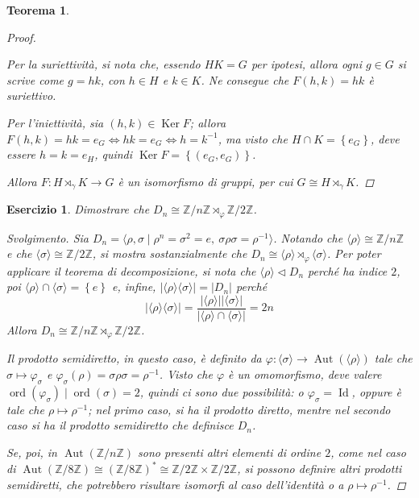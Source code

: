 \documentclass[12pt]{scrartcl}
\theoremstyle{style}
\newtheorem{teorema}{Teorema}[section]
\newtheorem{esercizio}{Esercizio}[section]
\newenvironment{svolgimento}{\renewcommand\qedsymbol{$\blacksquare$}\begin{proof}[Svolgimento]}{\end{proof}}
\numberwithin{equation}{subsection}
\begin{document}
\begin{teorema}
\begin{proof}
\begin{itemize}
				Per la suriettivit\`a, si nota che, essendo $HK = G$ per ipotesi, allora ogni $g \in G$ si scrive come $g = hk$, con $h \in H$ e $k \in K$.
				Ne consegue che $F(h,k) = hk$ \`e suriettivo.

				Per l'iniettivit\`a, sia $(h,k) \in \operatorname{Ker} F$; allora $F(h,k) = hk = e_G \iff hk = e_G \iff h = k^{-1}$, ma visto che $H\cap K = \left\{ e_G \right\} $, deve essere $h=k = e_H$, quindi $\operatorname{Ker} F = \left\{ (e_G,e_G) \right\} $.
		\end{itemize}
	Allora $F: H\rtimes _\gamma K \to G$ \`e un isomorfismo di gruppi, per cui $G \cong H \rtimes _\gamma K$.
	\end{proof}
\end{teorema}
\begin{esercizio}
Dimostrare che $D_n \cong \mathbb{Z}/ n\mathbb{Z}\rtimes _\varphi \mathbb{Z}/ 2\mathbb{Z}$.
\begin{svolgimento}
	Sia $D_n = \langle \rho , \sigma   \mid \rho ^n = \sigma ^2 = e, \ \sigma \rho \sigma = \rho ^{-1} \rangle$. 
	Notando che $\langle \rho  \rangle\cong \mathbb{Z} / n \mathbb{Z}$ e che $\langle \sigma  \rangle\cong \mathbb{Z} / 2 \mathbb{Z}$, si mostra sostanzialmente che $D_n\cong \langle \rho  \rangle\rtimes_\varphi  \langle \sigma  \rangle$.
	Per poter applicare il teorema di decomposizione, si nota che $\langle \rho  \rangle \lhd D_n$ perch\'e ha indice $2$, poi $\langle \rho  \rangle\cap \langle \sigma  \rangle = \left\{ e \right\} $ e, infine, $\lvert \langle \rho  \rangle\langle \sigma  \rangle \rvert = \lvert D_n \rvert $ perch\'e
\[
\lvert \langle \rho  \rangle\langle \sigma  \rangle \rvert = \frac{\lvert \langle \rho  \rangle \rvert \lvert \langle \sigma  \rangle \rvert }{\lvert \langle \rho  \rangle\cap\langle \sigma  \rangle \rvert } = 2n
\] 
Allora $D_n \cong \mathbb{Z}/n\mathbb{Z}\rtimes _\varphi \mathbb{Z}/2\mathbb{Z}$.

	Il prodotto semidiretto, in questo caso, \`e definito da $\varphi : \langle \sigma  \rangle\to \operatorname{Aut} (\langle \rho  \rangle)$ tale che $\sigma \longmapsto \varphi _\sigma  $ e $\varphi _\sigma (\rho ) = \sigma \rho \sigma = \rho ^{-1}$.
	Visto che $\varphi$ \`e un omomorfismo, deve valere $\operatorname{ord}(\varphi _\sigma )  \mid \operatorname{ord}(\sigma  ) =2$, quindi ci sono due possibilit\`a: o $\varphi _\sigma  = \operatorname{Id} $, oppure \`e tale che $\rho \longmapsto \rho ^{-1}$; nel primo caso, si ha il prodotto diretto, mentre nel secondo caso si ha il prodotto semidiretto che definisce $D_n$.

	Se, poi, in $\operatorname{Aut} (\mathbb{Z}/n\mathbb{Z})$ sono presenti altri elementi di ordine $2$, come nel caso di $\operatorname{Aut} (\mathbb{Z}/8\mathbb{Z})\cong (\mathbb{Z}/8\mathbb{Z})^* \cong \mathbb{Z}/2\mathbb{Z}\times \mathbb{Z}/2\mathbb{Z}$, si possono definire altri prodotti semidiretti, che potrebbero risultare isomorfi al caso dell'identit\`a o a $\rho \longmapsto \rho ^{-1}$.
\end{svolgimento}
\end{esercizio}
\end{document}
